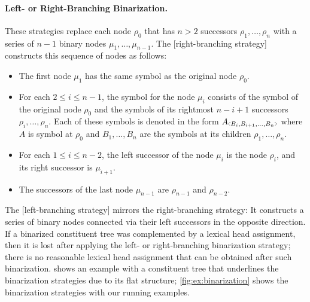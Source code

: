 \documentclass[../../document.tex]{subfiles}
\begin{document}
    \paragraph{Left- or Right-Branching Binarization.}
    These strategies replace each node \(\rho_0\) that has \( n>2 \) successors \(\rho_1, \ldots, \rho_n\) with a series of \( n-1 \) binary nodes \(\mu_1, \ldots, \mu_{n-1}\).
    The [right-branching strategy]  constructs this sequence of nodes as follows:
    \begin{itemize}
        \item The first node \(\mu_1\) has the same symbol as the original node \(\rho_0\).
        \item For each \(2 \leq i \leq n-1\), the symbol for the node \(\mu_i\) consists of the symbol of the original node \(\rho_0\) and the symbols of its rightmost \(n-i+1\) successors \(\rho_{i}, \ldots, \rho_n\). Each of these symbols is denoted in the form \(A\binsym{B_i,B_{i+1},\ldots,B_n}\) where \(A\) is symbol at \(\rho_0\) and \(B_1, \ldots, B_n\) are the symbols at its children \(\rho_1, \ldots, \rho_n\).
        \item For each \(1 \leq i \leq n-2\), the left successor of the node \(\mu_i\) is the node \(\rho_i\), and its right successor is \(\mu_{i+1}\).
        \item The successors of the last node \(\mu_{n-1}\) are \(\rho_{n-1}\) and \(\rho_{n-2}\).
    \end{itemize}
    The [left-branching strategy]  mirrors the right-branching strategy: It constructs a series of binary nodes connected via their left successors in the opposite direction.
    If a binarized constituent tree was complemented by a lexical head assignment, then it is lost after applying the left- or right-branching binarization strategy; there is no reasonable lexical head assignment that can be obtained after such binarization.
     shows an example with a constituent tree that underlines the binarization strategies due to its flat structure; \cref{fig:ex:binarization} shows the binarization strategies with our running examples.
\end{document}
